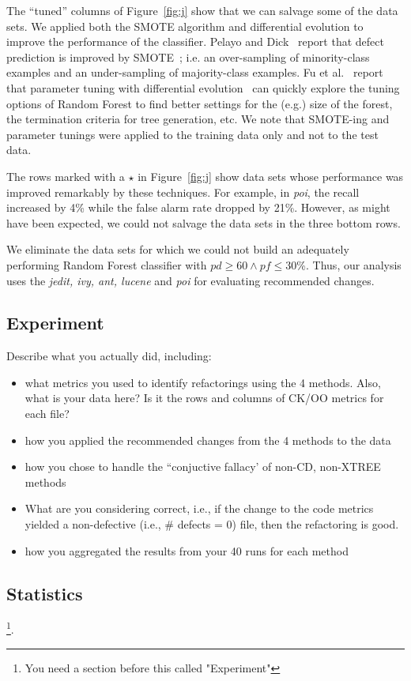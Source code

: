 \documentclass[twocolumn,5p]{elsarticle}
\newcommand{\bi}{\begin{itemize}[leftmargin=0.4cm]}
\newcommand{\ei}{\end{itemize}}
\newcommand{\fig}[1]{Figure~\ref{fig:#1}}
\theoremstyle{break}
\begin{document}
\begin{itemize}
The ``tuned'' columns of \fig{j} show that we can salvage some of the data sets. We applied both the SMOTE algorithm and differential evolution to improve the performance of the classifier. Pelayo and Dick~\cite{pelayo07} report that defect prediction is improved by SMOTE~\cite{Chawla2002}; i.e. an over-sampling of minority-class examples and an under-sampling of majority-class examples. Fu et al.~\cite{fu:ase15} report that parameter tuning with differential evolution~\cite{storn97} can quickly explore the tuning options of Random Forest to find better settings for the (e.g.) size of the forest, the termination criteria
for tree generation, etc. We note that SMOTE-ing and
parameter tunings were applied to the training data only and not to the test data.

The rows \colorbox{celadon}{marked with a $\star$} in \fig{j} show data sets whose performance was improved remarkably by these techniques. For example, in {\em poi}, the recall increased by 4\% while the false alarm rate dropped by 21\%. However, as might have been expected, we could not salvage the data sets in the  three bottom rows.

We eliminate the data sets for which we could not build an adequately performing Random Forest classifier with $\mathit{pd}\ge 60 \wedge \mathit{pf} \le 30$\%. Thus, our analysis uses the {\em jedit, ivy, ant, lucene} and {\em poi} for evaluating recommended changes.



\subsection{Experiment}
Describe what you actually did, including: 
\bi
\item what metrics you used to identify refactorings using the 4 methods. Also, what is your data here? Is it the rows and columns of CK/OO metrics for each file?
\item how you applied the recommended changes from the 4 methods to the data 
\item how you chose to handle the ``conjuctive fallacy' of non-CD, non-XTREE methods
\item What are you considering correct, i.e., if the change to the code metrics yielded a non-defective (i.e., \# defects = 0) file, then the refactoring is good. 
\item how you aggregated the results from your 40 runs for each method
\ei

\subsection{Statistics}\footnote{You need a section before this called "Experiment"}.



\end{itemize}
\end{document}
